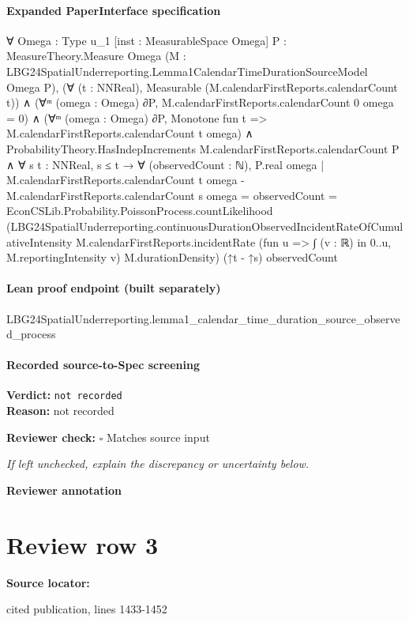 \documentclass[10pt]{article}
\newcommand{\reviewerbox}{%
  \par\noindent\fbox{\parbox{0.96\linewidth}{\rule{0pt}{0.38in}}}\par
}
\newcommand{\reviewmatch}[1]{%
  \par\noindent\textbf{Reviewer check:} $\square$\; #1\par
  \noindent\emph{If left unchecked, explain the discrepancy or uncertainty below.}\par
}
\begin{document}
\paragraph{Expanded PaperInterface specification}
\begin{ReviewVerbatim}
∀ {Omega : Type u_1} [inst : MeasurableSpace Omega] {P : MeasureTheory.Measure Omega}
  (M : LBG24SpatialUnderreporting.Lemma1CalendarTimeDurationSourceModel Omega P),
  (∀ (t : NNReal), Measurable (M.calendarFirstReports.calendarCount t)) ∧
    (∀ᵐ (omega : Omega) ∂P, M.calendarFirstReports.calendarCount 0 omega = 0) ∧
      (∀ᵐ (omega : Omega) ∂P, Monotone fun t => M.calendarFirstReports.calendarCount t omega) ∧
        ProbabilityTheory.HasIndepIncrements M.calendarFirstReports.calendarCount P ∧
          ∀ {s t : NNReal},
            s ≤ t →
              ∀ (observedCount : ℕ),
                P.real
                    {omega |
                      M.calendarFirstReports.calendarCount t omega - M.calendarFirstReports.calendarCount s omega =
                        observedCount} =
                  EconCSLib.Probability.PoissonProcess.countLikelihood
                    (LBG24SpatialUnderreporting.continuousDurationObservedIncidentRateOfCumulativeIntensity
                      M.calendarFirstReports.incidentRate (fun u => ∫ (v : ℝ) in 0..u, M.reportingIntensity v)
                      M.durationDensity)
                    (↑t - ↑s) observedCount
\end{ReviewVerbatim}

\paragraph{Lean proof endpoint (built separately)}\begin{ReviewVerbatim}
LBG24SpatialUnderreporting.lemma1_calendar_time_duration_source_observed_process
\end{ReviewVerbatim}

\paragraph{Recorded source-to-Spec screening}
\textbf{Verdict:} \texttt{not recorded}
\\
\textbf{Reason:} not recorded
\reviewmatch{Matches source input}
\noindent\textbf{Reviewer annotation}\par
\reviewerbox
\clearpage
\hypertarget{source-claim-b7aecea01cb2b90a}{}
\section*{Review row 3}
\textbf{Source locator:} {\footnotesize\raggedright cited publication, lines 1433-\allowbreak{}1452\par}
\end{document}
